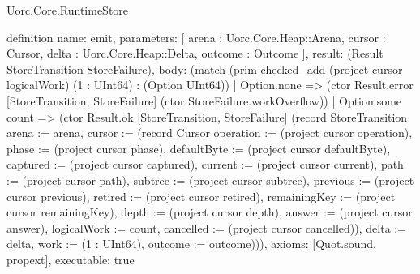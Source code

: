 \begin{lexlean}{Uorc.Core.RuntimeStore}
\begin{semanticmodule}
definition{
  name: emit,
  parameters: [
    arena : Uorc.Core.Heap::Arena,
    cursor : Cursor,
    delta : Uorc.Core.Heap::Delta,
    outcome : Outcome
  ],
  result: (Result StoreTransition StoreFailure),
  body: (match (prim checked_add (project cursor logicalWork) (1 : UInt64) : (Option UInt64))
    | Option.none => (ctor Result.error [StoreTransition, StoreFailure] (ctor StoreFailure.workOverflow))
    | Option.some count => (ctor Result.ok [StoreTransition, StoreFailure] (record StoreTransition {arena := arena, cursor := (record Cursor {operation := (project cursor operation), phase := (project cursor phase), defaultByte := (project cursor defaultByte), captured := (project cursor captured), current := (project cursor current), path := (project cursor path), subtree := (project cursor subtree), previous := (project cursor previous), retired := (project cursor retired), remainingKey := (project cursor remainingKey), depth := (project cursor depth), answer := (project cursor answer), logicalWork := count, cancelled := (project cursor cancelled)}), delta := delta, work := (1 : UInt64), outcome := outcome}))),
  axioms: [Quot.sound, propext],
  executable: true
}


\end{semanticmodule}
\end{lexlean}

